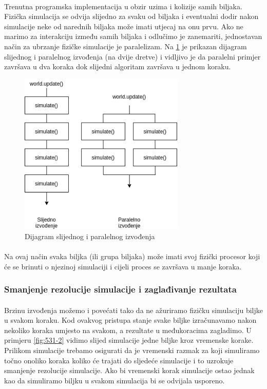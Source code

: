 \documentclass[times, utf8, diplomski]{fer}
\begin{document}
\paragraph{}
Trenutna programska implementacija u obzir uzima i kolizije samih biljaka. 
Fizička simulacija se odvija slijedno za svaku od biljaka i eventualni dodir 
nakon simulacije neke od narednih biljaka može imati utjecaj na onu prvu. Ako
ne marimo za interakciju između samih biljaka i odlučimo je zanemariti, 
jednostavan način za ubrzanje fizičke simulacije je paralelizam. Na \ref{fig:531-1} je 
prikazan dijagram slijednog i paralelnog izvođenja (na dvije dretve) i vidljivo je da 
paralelni primjer završava u dva koraka dok slijedni algoritam završava u jednom koraku.

\begin{figure}[h]
	\centering
	\includegraphics[width=0.7\textwidth]{img/531-1}
	\caption{Dijagram slijednog i paralelnog izvođenja}
	\label{fig:531-1}
\end{figure}
\paragraph{}
Na ovaj način svaka biljka (ili grupa biljaka) može imati svoj fizički procesor 
koji će se brinuti o njezinoj simulaciji i cijeli proces se završava u manje 
koraka.

\subsubsection{Smanjenje rezolucije simulacije i zaglađivanje rezultata}
\paragraph{}
Brzinu izvođenja možemo i povećati tako da ne ažuriramo fizičku simulaciju 
biljke u svakom koraku. Kod ovakvog pristupa stanje svake biljke izračunavamo 
nakon nekoliko koraka umjesto na svakom, a rezultate u međukoracima zagladimo.
U primjeru \ref{fig:531-2} vidimo slijed simulacije jedne biljke kroz vremenske 
korake. Prilikom simulacije trebamo osigurati da je vremenski razmak za koji 
simuliramo točno onoliko koraka koliko će trajati do sljedeće simulacije i to 
uzrokuje smanjenje rezolucije simulacije. Ako bi vremenski korak simulacije 
ostao jednak kao da simuliramo biljku u svakom simulacija bi se odvijala 
usporeno.
\end{document}
